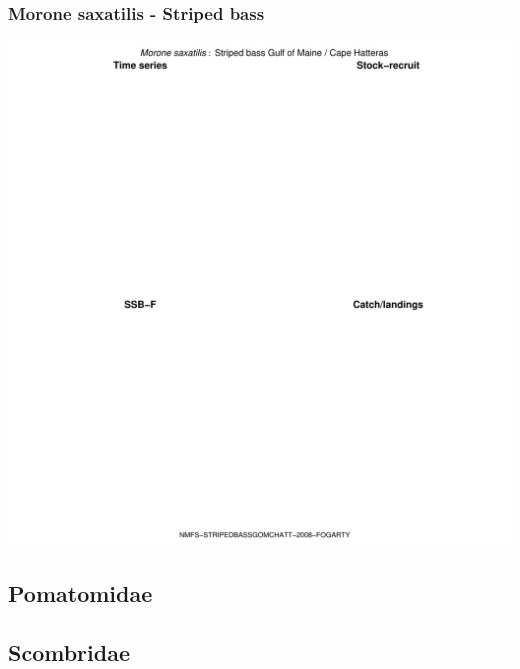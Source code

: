 \subsubsection{Morone saxatilis - Striped bass}
\begin{center}
\includegraphics[width=1.2\textwidth]{../R/figures/NMFS-STRIPEDBASSGOMCHATT-2008-FOGARTY.pdf}
\end{center}

\subsection{Pomatomidae}

\subsection{Scombridae}

